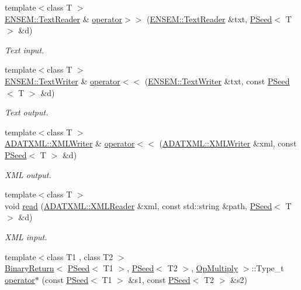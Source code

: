 \begin{DoxyCompactItemize}
{\footnotesize template$<$class T $>$ }\\\mbox{\hyperlink{classENSEM_1_1TextReader}{E\+N\+S\+E\+M\+::\+Text\+Reader}} \& \mbox{\hyperlink{group__primseed_ga1ab70381c53bf81dbfeced414a44a1d5}{operator$>$$>$}} (\mbox{\hyperlink{classENSEM_1_1TextReader}{E\+N\+S\+E\+M\+::\+Text\+Reader}} \&txt, \mbox{\hyperlink{classENSEM_1_1PSeed}{P\+Seed}}$<$ T $>$ \&d)
\begin{DoxyCompactList}\small\item\em Text input. \end{DoxyCompactList}\item 
{\footnotesize template$<$class T $>$ }\\\mbox{\hyperlink{classENSEM_1_1TextWriter}{E\+N\+S\+E\+M\+::\+Text\+Writer}} \& \mbox{\hyperlink{group__primseed_ga297984102d54c010e9c54ca03f4f8151}{operator$<$$<$}} (\mbox{\hyperlink{classENSEM_1_1TextWriter}{E\+N\+S\+E\+M\+::\+Text\+Writer}} \&txt, const \mbox{\hyperlink{classENSEM_1_1PSeed}{P\+Seed}}$<$ T $>$ \&d)
\begin{DoxyCompactList}\small\item\em Text output. \end{DoxyCompactList}\item 
{\footnotesize template$<$class T $>$ }\\\mbox{\hyperlink{classADATXML_1_1XMLWriter}{A\+D\+A\+T\+X\+M\+L\+::\+X\+M\+L\+Writer}} \& \mbox{\hyperlink{group__primseed_ga439f61b77175a57d5c91c25e0eda2733}{operator$<$$<$}} (\mbox{\hyperlink{classADATXML_1_1XMLWriter}{A\+D\+A\+T\+X\+M\+L\+::\+X\+M\+L\+Writer}} \&xml, const \mbox{\hyperlink{classENSEM_1_1PSeed}{P\+Seed}}$<$ T $>$ \&d)
\begin{DoxyCompactList}\small\item\em X\+ML output. \end{DoxyCompactList}\item 
{\footnotesize template$<$class T $>$ }\\void \mbox{\hyperlink{group__primseed_ga419a0f6fba320ad373bae7c40e3d2330}{read}} (\mbox{\hyperlink{classADATXML_1_1XMLReader}{A\+D\+A\+T\+X\+M\+L\+::\+X\+M\+L\+Reader}} \&xml, const std\+::string \&path, \mbox{\hyperlink{classENSEM_1_1PSeed}{P\+Seed}}$<$ T $>$ \&d)
\begin{DoxyCompactList}\small\item\em X\+ML input. \end{DoxyCompactList}\item 
{\footnotesize template$<$class T1 , class T2 $>$ }\\\mbox{\hyperlink{structENSEM_1_1BinaryReturn}{Binary\+Return}}$<$ \mbox{\hyperlink{classENSEM_1_1PSeed}{P\+Seed}}$<$ T1 $>$, \mbox{\hyperlink{classENSEM_1_1PSeed}{P\+Seed}}$<$ T2 $>$, \mbox{\hyperlink{structENSEM_1_1OpMultiply}{Op\+Multiply}} $>$\+::Type\+\_\+t \mbox{\hyperlink{group__primseed_ga519cf992fa84c24500a0128f1c684b8f}{operator$\ast$}} (const \mbox{\hyperlink{classENSEM_1_1PSeed}{P\+Seed}}$<$ T1 $>$ \&s1, const \mbox{\hyperlink{classENSEM_1_1PSeed}{P\+Seed}}$<$ T2 $>$ \&s2)

\end{DoxyCompactItemize}
